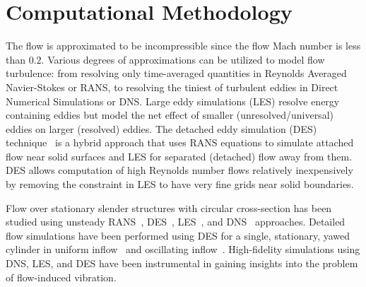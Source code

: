 \section{Computational Methodology}
\label{sec:methodology}
%
The flow is approximated to be incompressible since the flow Mach number is
less than $0.2$. Various degrees of approximations can be utilized to model
flow turbulence: from resolving only time-averaged quantities in Reynolds
Averaged Navier-Stokes or RANS, to resolving the tiniest of turbulent eddies in
Direct Numerical Simulations or DNS. Large eddy simulations (LES) resolve
energy containing eddies but model the net effect of smaller
(unresolved/universal) eddies on larger (resolved) eddies. The detached eddy
simulation (DES) technique~\citep{spalart1997comments} is a hybrid approach
that uses RANS equations to simulate attached flow near solid surfaces and LES
for separated (detached) flow away from them. DES allows computation of high
Reynolds number flows relatively inexpensively by removing the constraint in
LES to have very fine grids near solid boundaries.

Flow over stationary slender structures with circular cross-section has been
studied using unsteady RANS~\citep{pontaza2009three},
DES~\citep{travin2000detached,yeo2011computational,yeo2012aerodynamic},
LES~\citep{breuer1998large,kravchenko2000numerical,catalano2003numerical}, and
DNS~\citep{dong2005dns,zhao2009direct} approaches. Detailed flow simulations
have been performed using DES for a single, stationary, yawed cylinder in
uniform inflow~\citep{yeo2007characteristics,yeo2008investigation} and
oscillating inflow~\citep{yeo2012aerodynamic}. 
High-fidelity simulations using DNS, LES, and DES have been instrumental in
gaining insights into the problem of flow-induced vibration.

